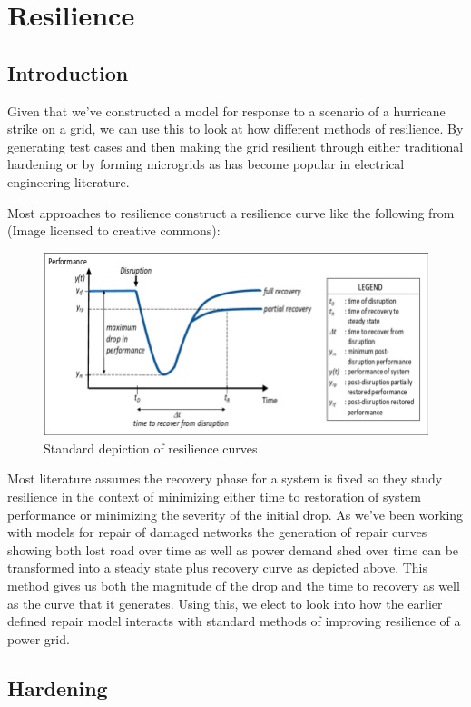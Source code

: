 \documentclass{article}
\begin{document}
	\section{Resilience}
	\subsection{Introduction}
	Given that we've constructed a model for response to a scenario of a hurricane strike on a grid, we can use this to look at how different methods of resilience. By generating test cases and then making the grid resilient through either traditional hardening or by forming microgrids as has become popular in electrical engineering literature. 
	
	Most approaches to resilience construct a resilience curve like the following from \cite{Madni2020} (Image licensed to creative commons):
	
	\begin{figure}[htbp]
	\centering
	\includegraphics[width=.9\linewidth]{resiliencecurve.png}
	\caption{Standard depiction of resilience curves}
	\end{figure}
	
	Most literature assumes the recovery phase for a system is fixed so they study resilience in the context of minimizing either time to restoration of system performance or minimizing the severity of the initial drop. As we've been working with models for repair of damaged networks the generation of repair curves showing both lost road over time as well as power demand shed over time can be transformed into a steady state plus recovery curve as depicted above. This method gives us both the magnitude of the drop and the time to recovery as well as the curve that it generates. Using this, we elect to look into how the earlier defined repair model interacts with standard methods of improving resilience of a power grid.
	
	\subsection{Hardening}
	
\end{document}
